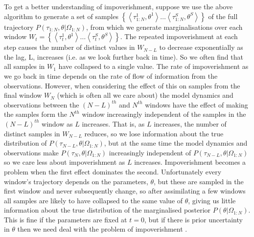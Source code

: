 \documentclass{article}
\begin{document}
To get a better understanding of impoverishment, suppose we use the above algorithm to generate a set of samples $\left\{\left<\tau_{1:N}^1,\theta^1\right> \dots \left<\tau_{1:N}^S,\theta^S\right>\right\}$ of the full trajectory $P(\tau_{1:N},\theta|\Omega_{1:N})$, from which we generate marginalisations over each window $W_t = \left\{\left<\tau_t^1,\theta^1\right> \dots \left<\tau_t^S,\theta^S\right>\right\}$. The repeated impoverishment at each step causes the number of distinct values in $W_{N-L}$ to decrease exponentially as the lag, L, increases (i.e. as we look further back in time). So we often find that all samples in $W_1$ have collapsed to a single value. The rate of impoverishment as we go back in time depends on the rate of flow of information from the observations. However, when considering the effect of this on samples from the final window $W_N$ (which is often all we care about) the model dynamics and observations between the $(N-L)^{th}$ and $N^{th}$ windows have the effect of making the samples form the $N^{th}$ window increasingly independent of the samples in the $(N-L)^{th}$ window as $L$ increases. That is, as $L$ increases, the number of distinct samples in $W_{N-L}$ reduces, so we lose information about the true distribution of $P(\tau_{N-L},\theta|\Omega_{1:N})$, but at the same time the model dynamics and observations make $P(\tau_{N},\theta|\Omega_{1:N})$ increasingly independent of $P(\tau_{N-L},\theta|\Omega_{1:N})$ so we care less about impoverishment as $L$ increases. Impoverishment becomes a problem when the first effect dominates the second. Unfortunately every window's trajectory depends on the parameters, $\theta$, but these are sampled in the first window and never subsequently change, so after assimilating a few windows all samples are likely to have collapsed to the same value of $\theta$, giving us little information about the true distribution of the marginalised posterior $P(\theta|\Omega_{1:N})$. This is fine if the parameters are fixed at $t=0$, but if there is prior uncertainty in $\theta$ then we need deal with the problem of impoverishment \citep*{liu2001combined, andrieu2004particle}.
\end{document}
